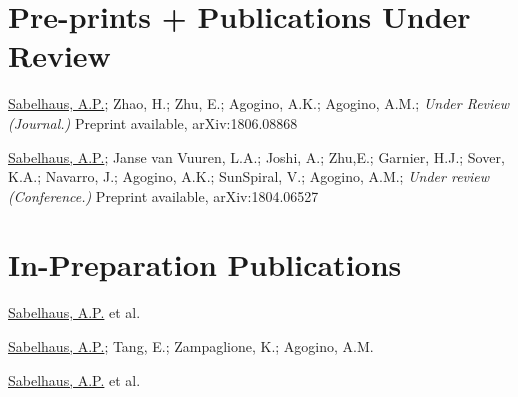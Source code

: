 \documentclass[letterpaper]{deedy-resume} %
\begin{document}


\section{Pre-prints + Publications Under Review}

\begin{etaremune}
  
\item {} \underline{Sabelhaus, A.P.}; Zhao, H.; Zhu, E.; Agogino, A.K.; Agogino, A.M.; {\it Under Review (Journal.)} Preprint available, arXiv:1806.08868

\item {} \underline{Sabelhaus, A.P.}; Janse van Vuuren, L.A.; Joshi, A.; Zhu,E.; Garnier, H.J.; Sover, K.A.; Navarro, J.; Agogino, A.K.; SunSpiral, V.; Agogino, A.M.; {\it Under review (Conference.)} Preprint available, arXiv:1804.06527 

\end{etaremune}  

  
\section{In-Preparation Publications}

\vspace{0.2cm}

\begin{etaremune}


\item {} \underline{Sabelhaus, A.P.} et al.

\item {} \underline{Sabelhaus, A.P.}; Tang, E.; Zampaglione, K.; Agogino, A.M.
  
\item {} \underline{Sabelhaus, A.P.} et al.

\end{etaremune}
\end{document}
